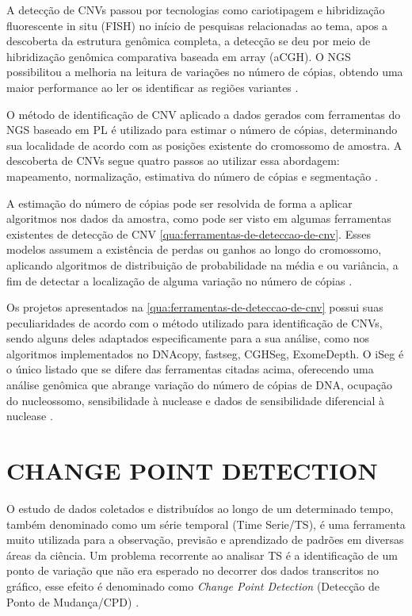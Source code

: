 A detecção de CNVs passou por tecnologias como cariotipagem e hibridização fluorescente in situ (FISH) no início de pesquisas relacionadas ao tema, apos a descoberta da estrutura genômica completa, a detecção se deu por meio de hibridização genômica comparativa baseada em array (aCGH). O NGS possibilitou a melhoria na leitura de variações no número de cópias, obtendo uma maior performance ao ler os identificar as regiões variantes \cite{Zhao2013}. 

O método de identificação de CNV aplicado a dados gerados com ferramentas do NGS baseado em PL é utilizado para estimar o número de cópias, determinando sua localidade de acordo com as posições existente do cromossomo de amostra. A descoberta de CNVs segue quatro passos ao utilizar essa abordagem: mapeamento, normalização, estimativa do número de cópias e segmentação \cite{Zhao2013}.

A estimação do número de cópias pode ser resolvida de forma a aplicar algoritmos nos dados da amostra, como pode ser visto em algumas ferramentas existentes de detecção de CNV \autoref{qua:ferramentas-de-deteccao-de-cnv}. Esses modelos assumem a existência de perdas ou ganhos ao longo do cromossomo, aplicando algoritmos de distribuição de probabilidade na média e ou variância, a fim de detectar a localização de alguma variação no número de cópias \cite{Zhao2013}.




Os projetos apresentados na \autoref{qua:ferramentas-de-deteccao-de-cnv} possui suas peculiaridades de acordo com o método utilizado para identificação de CNVs, sendo alguns deles adaptados especificamente para a sua análise, como nos algoritmos implementados no DNAcopy, fastseg, CGHSeg, ExomeDepth. O iSeg é o único listado que se difere das ferramentas citadas acima, oferecendo uma análise genômica que abrange variação do número de cópias de DNA, ocupação do nucleossomo, sensibilidade à nuclease e dados de sensibilidade diferencial à nuclease \cite{Girimurugan2018}. 

\section{CHANGE POINT DETECTION}

O estudo de dados coletados e distribuídos ao longo de um determinado tempo, também denominado como um série temporal (Time Serie/TS), é uma ferramenta muito utilizada para a observação, previsão e aprendizado de padrões em diversas áreas da ciência. Um problema recorrente ao analisar TS é a identificação de um ponto de variação que não era esperado no decorrer dos dados transcritos no gráfico, esse efeito é denominado como \textit{Change Point Detection} (Detecção de Ponto de Mudança/CPD) \cite{Aminikhanghahi2017}.

